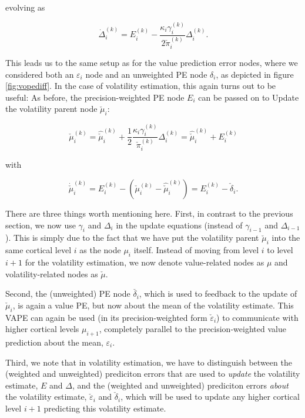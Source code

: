 evolving as 

\begin{equation}
	\dot{\Delta}_i^{(k)} = E_i^{(k)} - \frac{\kappa_i \gamma_i^{(k)}}{2 \check{\pi}_i^{(k)}} \Delta_i^{(k)}.
\end{equation}


This leads us to the same setup as for the value prediction error nodes, where we considered both an $\varepsilon_i$ node and an unweighted PE node $\delta_i$, as depicted in figure \ref{fig:vopediff}. In the case of volatility estimation, this again turns out to be useful: As before, the precision-weighted PE node $E_i$ can be passed on to \textsf{Update} the volatility parent node $\check{\mu}_i$:

\begin{equation}
	\check{\mu}_i^{(k)} = \hat{\check{\mu}}_i^{(k)} + \frac{1}{2} \frac{\kappa_i \gamma_i^{(k)}}{\check{\pi}_i^{(k)}} \Delta_i^{(k)} = \hat{\check{\mu}}_i^{(k)} + E_i^{(k)}
\end{equation}

with 

\begin{equation}
	\dot{\check{\mu}}_i^{(k)} = E_i^{(k)} - (\check{\mu}_i^{(k)} - \hat{\check{\mu}}_i^{(k)}) = E_i^{(k)} - \check{\delta}_i.
\end{equation}

There are three things worth mentioning here. First, in contrast to the previous section, we now use $\gamma_i$ and $\Delta_i$ in the update equations (instead of $\gamma_{i-1}$ and $\Delta_{i-1}$). This is simply due to the fact that we have put the volatility parent $\check{\mu}_i$ into the same cortical level $i$ as the node $\mu_i$ itself. Instead of moving from level $i$ to level $i+1$ for the volatility estimation, we now denote value-related nodes as $\mu$ and volatility-related nodes as $\check{\mu}$.

Second, the (unweighted) PE node $\check{\delta_i}$, which is used to feedback to the update of $\check{\mu}_i$, is again a value PE, but now about the mean of the volatility estimate. This \textsf{VAPE} can again be used (in its precision-weighted form $\check{\varepsilon}_i$) to communicate with higher cortical levels $\mu_{i+1}$, completely parallel to the precision-weighted value prediction about the mean, $\varepsilon_i$.

Third, we note that in volatility estimation, we have to distinguish between the (weighted and unweighted) prediciton errors that are used to \textit{update} the volatility estimate, $E$ and $\Delta$, and the (weighted and unweighted) prediciton errors \textit{about} the volatility estimate, $\check{\varepsilon}_i$ and $\check{\delta}_i$, which will be used to update any higher cortical level $i+1$ predicting this volatility estimate. 

